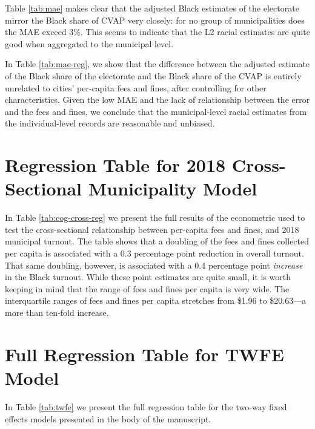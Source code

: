 \documentclass[
  12pt,
]{article}
\begin{document}
Table \ref{tab:mae} makes clear that the adjusted Black estimates of the electorate mirror the Black share of CVAP very closely: for no group of municipalities does the MAE exceed 3\%. This seems to indicate that the L2 racial estimates are quite good when aggregated to the municipal level.

In Table \ref{tab:mae-reg}, we show that the difference between the adjusted estimate of the Black share of the electorate and the Black share of the CVAP is entirely unrelated to cities' per-capita fees and fines, after controlling for other characteristics. Given the low MAE and the lack of relationship between the error and the fees and fines, we conclude that the municipal-level racial estimates from the individual-level records are reasonable and unbiased.

\begin{singlespace}

\end{singlespace}

\hypertarget{regression-table-for-2018-cross-sectional-municipality-model}{%
\section*{Regression Table for 2018 Cross-Sectional Municipality Model}\label{regression-table-for-2018-cross-sectional-municipality-model}}

In Table \ref{tab:cog-cross-reg} we present the full results of the econometric used to test the cross-sectional relationship between per-capita fees and fines, and 2018 municipal turnout. The table shows that a doubling of the fees and fines collected per capita is associated with a 0.3 percentage point reduction in overall turnout. That same doubling, however, is associated with a 0.4 percentage point \emph{increase} in the Black turnout. While these point estimates are quite small, it is worth keeping in mind that the range of fees and fines per capita is very wide. The interquartile ranges of fees and fines per capita stretches from \$1.96 to \$20.63---a more than ten-fold increase.

\begin{singlespace}

\end{singlespace}

\hypertarget{full-regression-table-for-twfe-model}{%
\section*{Full Regression Table for TWFE Model}\label{full-regression-table-for-twfe-model}}

In Table \ref{tab:twfe} we present the full regression table for the two-way fixed effects models presented in the body of the manuscript.

\begin{singlespace}

\end{singlespace}
\end{document}
